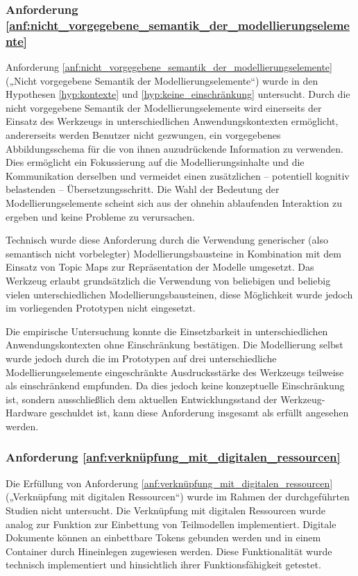 \subsubsection{Anforderung \ref{anf:nicht_vorgegebene_semantik_der_modellierungselemente}}
Anforderung \ref{anf:nicht_vorgegebene_semantik_der_modellierungselemente} („Nicht vorgegebene Semantik der Modellierungselemente“) wurde in den Hypothesen \ref{hyp:kontexte} und \ref{hyp:keine_einschränkung} untersucht. Durch die nicht vorgegebene Semantik der Modellierungselemente wird einerseits der Einsatz des Werkzeugs in unterschiedlichen Anwendungskontexten ermöglicht, andererseits werden Benutzer nicht gezwungen, ein vorgegebenes Abbildungsschema für die von ihnen auzudrückende Information zu verwenden. Dies ermöglicht ein Fokussierung auf die Modellierungsinhalte und die Kommunikation derselben und vermeidet einen zusätzlichen -- potentiell kognitiv belastenden -- Übersetzungsschritt. Die Wahl der Bedeutung der Modellierungselemente scheint sich aus der ohnehin ablaufenden Interaktion zu ergeben und keine Probleme zu verursachen. 

Technisch wurde diese Anforderung durch die Verwendung generischer (also semantisch nicht vorbelegter) Modellierungsbausteine in Kombination mit dem Einsatz von Topic Maps zur Repräsentation der Modelle umgesetzt. Das Werkzeug erlaubt grundsätzlich die Verwendung von beliebigen und beliebig vielen unterschiedlichen Modellierungsbausteinen, diese Möglichkeit wurde jedoch im vorliegenden Prototypen nicht eingesetzt. 

Die empirische Untersuchung konnte die Einsetzbarkeit in unterschiedlichen Anwendungskontexten ohne Einschränkung bestätigen. Die Modellierung selbst wurde jedoch durch die im Prototypen auf drei unterschiedliche Modellierungselemente eingeschränkte Ausdrucksstärke des Werkzeugs teilweise als einschränkend empfunden. Da dies jedoch keine konzeptuelle Einschränkung ist, sondern ausschließlich dem aktuellen Entwicklungsstand der Werkzeug-Hardware geschuldet ist, kann diese Anforderung insgesamt als erfüllt angesehen werden. 

\subsubsection{Anforderung \ref{anf:verknüpfung_mit_digitalen_ressourcen}}
Die Erfüllung von Anforderung \ref{anf:verknüpfung_mit_digitalen_ressourcen} („Verknüpfung mit digitalen Ressourcen“) wurde im Rahmen der durchgeführten Studien nicht untersucht. Die Verknüpfung mit digitalen Ressourcen wurde analog zur Funktion zur Einbettung von Teilmodellen implementiert. Digitale Dokumente können an einbettbare Tokens gebunden werden und in einem Container durch Hineinlegen zugewiesen werden. Diese Funktionalität wurde technisch implementiert und hinsichtlich ihrer Funktionsfähigkeit getestet. 

